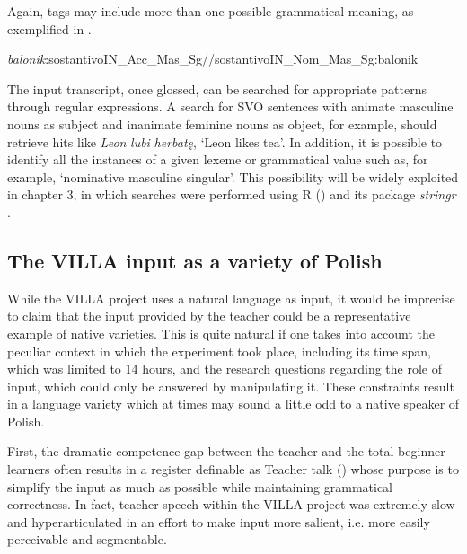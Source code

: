 Again, tags may include more than one possible grammatical meaning, as exemplified in .

\ea%
    \label{ex:02:1}
    \textit{balonik}:sostantivoIN\_Acc\_Mas\_Sg//sostantivoIN\_Nom\_Mas\_Sg:balonik
    \z

The input transcript, once glossed, can be searched for appropriate patterns through regular expressions. A search for SVO sentences with animate masculine nouns as subject and inanimate feminine nouns as object, for example, should retrieve hits like \textit{Leon} \textit{lubi} \textit{herbatę}, ‘Leon likes tea’. In addition, it is possible to identify all the instances of a given lexeme or grammatical value such as, for example, ‘nominative masculine singular’. This possibility will be widely exploited in chapter 3, in which searches were performed using R (\citealt{RCoreTeam2017}) and its package \textit{stringr} \citep{Wickham2017}.

\subsection{The VILLA input as a variety of Polish}\label{sec:02:1.3}

While the VILLA project uses a natural language as input, it would be imprecise to claim that the input provided by the teacher could be a representative example of native varieties. This is quite natural if one takes into account the peculiar context in which the experiment took place, including its time span, which was limited to 14 hours, and the research questions regarding the role of input, which could only be answered by manipulating it. These constraints result in a language variety which at times may sound a little odd to a native speaker of Polish. 

First, the dramatic competence gap between the teacher and the total beginner learners often results in a register definable as Teacher talk (\citealt[134–144]{Larsen-FreemanLong1991}) whose purpose is to simplify the input as much as possible while maintaining grammatical correctness. In fact, teacher speech within the VILLA project was extremely slow and hyperarticulated in an effort to make input more salient, i.e. more easily perceivable and segmentable. 

